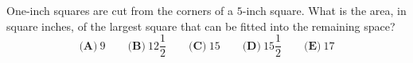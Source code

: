 One-inch squares are cut from the corners of a $5$-inch square. What is the area, in square inches, of the largest square that can be fitted into the remaining space?
\[
\textbf{(A)}\ 9\qquad\textbf{(B)}\ 12\dfrac{1}{2}\qquad\textbf{(C)}\ 15\qquad\textbf{(D)}\ 15\dfrac{1}{2}\qquad\textbf{(E)}\ 17
\]
